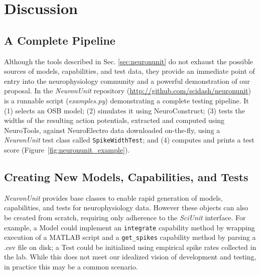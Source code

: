 \documentclass{frontiersSCNS}
\let\verbx\lstinline
\begin{document}
\section{Discussion}\label{sec:discussion}

\subsection{A Complete Pipeline}
Although the tools described in Sec. \ref{sec:neuronunit} do not exhaust the possible sources of models, capabilities, and test data, they provide an immediate point of entry into the neurophysiology community and a powerful demonstration of our proposal. 
In the \textit{NeuronUnit} repository (\url{http://github.com/scidash/neuronunit}) is a runnable script (\textit{examples.py}) demonstrating a complete testing pipeline. 
It (1) selects an OSB model; 
(2) simulates it using NeuroConstruct; 
(3) tests the widths of the resulting action potentials, extracted and computed using NeuroTools, against NeuroElectro data downloaded on-the-fly, using a \textit{NeuronUnit} test class called \verbx{SpikeWidthTest}; 
and (4) computes and prints a test score (Figure~\ref{fig:neuronunit_example}).


\subsection{Creating New Models, Capabilities, and Tests}
\textit{NeuronUnit} provides base classes to enable rapid generation of models, capabilities, and tests for neurophysiology data. 
However these objects can also be created from scratch, requiring only adherence to the \textit{SciUnit} interface. 
For example, a Model could implement an \verbx{integrate} capability method by wrapping execution of a MATLAB script and a \verbx{get_spikes} capability method by parsing a .csv file on disk; 
a Test could be initialized using empirical spike rates collected in the lab.  
While this does not meet our idealized vision of development and testing, in practice this may be a common scenario. 
\end{document}

